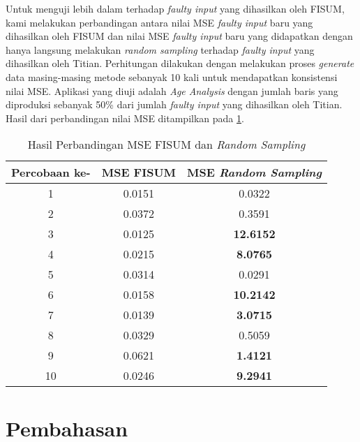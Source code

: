 \begin{enumerate}[topsep=0pt]
      Untuk menguji lebih dalam terhadap \emph{faulty input} yang dihasilkan oleh FISUM,
      kami melakukan perbandingan antara nilai MSE \emph{faulty input} baru
      yang dihasilkan oleh FISUM dan nilai MSE \emph{faulty input} baru
      yang didapatkan dengan hanya langsung melakukan 
      \emph{random sampling} terhadap \emph{faulty input} yang dihasilkan oleh
      Titian. 
      Perhitungan dilakukan dengan melakukan proses \emph{generate} data
      masing-masing metode sebanyak 10 kali untuk mendapatkan
      konsistensi nilai MSE. 
      Aplikasi yang diuji adalah 
      \emph{Age Analysis} dengan jumlah baris yang diproduksi sebanyak
      50\% dari jumlah \emph{faulty input} yang dihasilkan oleh Titian.
      Hasil dari perbandingan nilai MSE ditampilkan pada \ref{tab:PerbandinganMSE}.
      
      
      \begin{table}[H]
      \centering
      \caption{Hasil Perbandingan MSE FISUM dan \emph{Random Sampling}}
      \label{tab:PerbandinganMSE}
      \begin{tabular}{|c|c|c|}
      \hline
      \textbf{Percobaan ke-} & \textbf{MSE FISUM} & \textbf{MSE \emph{Random Sampling}}\\
      \hline
      1 & 0.0151 & 0.0322 \\
      \hline
      2 & 0.0372 & 0.3591 \\
      \hline
      3 & 0.0125 & \textbf{12.6152} \\
      \hline
      4 & 0.0215 & \textbf{8.0765} \\
      \hline
      5 & 0.0314 & 0.0291 \\
      \hline
      6 & 0.0158 & \textbf{10.2142} \\
      \hline
      7 & 0.0139 & \textbf{3.0715} \\
      \hline
      8 & 0.0329 & 0.5059 \\
      \hline
      9 & 0.0621 & \textbf{1.4121} \\
      \hline
      10 & 0.0246 & \textbf{9.2941} \\
      \hline
      \end{tabular}
      \end{table}
      
  \end{enumerate}

\section{Pembahasan}
\label{sec:pembahasan}

